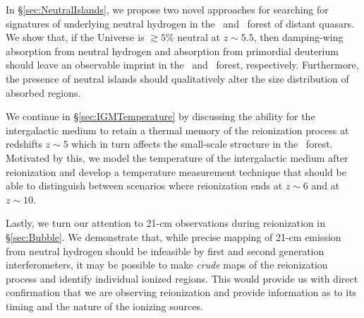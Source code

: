In \S \ref{sec:NeutralIslands}, we propose two novel approaches for searching for signatures of underlying neutral hydrogen in the \lya\ and \lyb\ forest of distant quasars. We show that, if the Universe is $\gtrsim 5\%$ neutral at $z \sim 5.5$, then damping-wing absorption from neutral hydrogen and absorption from primordial deuterium should leave an observable imprint in the \lya\ and \lyb\ forest, respectively. Furthermore, the presence of neutral islands should qualitatively alter the size distribution of absorbed regions.


We continue in \S \ref{sec:IGMTemperature} by discussing the ability for the intergalactic medium to retain a thermal memory of the reionization process at redshifts $z \sim 5$ which in turn affects the small-scale structure in the \lya\ forest. Motivated by this, we model the temperature of the intergalactic medium after reionization and develop a temperature measurement technique that should be able to distinguish between  scenarios where reionization ends at $z \sim 6$ and at $z \sim 10$. 


Lastly, we turn our attention to 21-cm observations during reionization in \S \ref{sec:Bubble}. We demonstrate that, while precise mapping of 21-cm emission from neutral hydrogen should be infeasible by first and second generation interferometers, it may be possible to make \textit{crude} maps of the reionization process and identify individual ionized regions. This would provide us with direct confirmation that we are observing reionization and provide information as to its timing and the nature of the ionizing sources.
